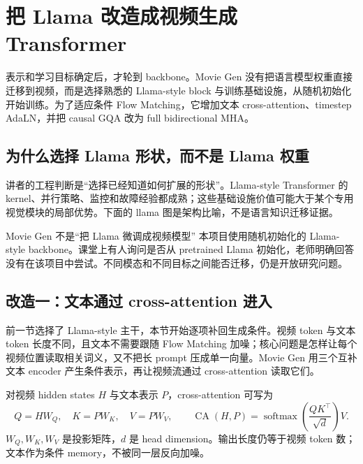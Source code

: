 \section{把 Llama 改造成视频生成 Transformer}

表示和学习目标确定后，才轮到 backbone。Movie Gen 没有把语言模型权重直接迁移到视频，而是选择熟悉的 Llama-style block 与训练基础设施，从随机初始化开始训练。为了适应条件 Flow Matching，它增加文本 cross-attention、timestep AdaLN，并把 causal GQA 改为 full bidirectional MHA。

\subsection{为什么选择 Llama 形状，而不是 Llama 权重}

讲者的工程判断是“选择已经知道如何扩展的形状”。Llama-style Transformer 的 kernel、并行策略、监控和故障经验都成熟；这些基础设施价值可能大于某个专用视觉模块的局部优势。下面的 llama 图是架构比喻，不是语言知识迁移证据。


\begin{warningbox}{Movie Gen 不是“把 Llama 微调成视频模型”}
本项目使用随机初始化的 Llama-style backbone。课堂上有人询问是否从 pretrained Llama 初始化，老师明确回答没有在该项目中尝试。不同模态和不同目标之间能否迁移，仍是开放研究问题。
\end{warningbox}


\subsection{改造一：文本通过 cross-attention 进入}

前一节选择了 Llama-style 主干，本节开始逐项补回生成条件。视频 token 与文本 token 长度不同，且文本不需要跟随 Flow Matching 加噪；核心问题是怎样让每个视频位置读取相关词义，又不把长 prompt 压成单一向量。Movie Gen 用三个互补文本 encoder 产生条件表示，再让视频流通过 cross-attention 读取它们。


对视频 hidden states $H$ 与文本表示 $P$，cross-attention 可写为
\[
Q=HW_Q,\quad K=PW_K,\quad V=PW_V,
\qquad
\operatorname{CA}(H,P)=\operatorname{softmax}\!\left(\frac{QK^\top}{\sqrt d}\right)V.
\]
$W_Q,W_K,W_V$ 是投影矩阵，$d$ 是 head dimension。输出长度仍等于视频 token 数；文本作为条件 memory，不被同一层反向加噪。

